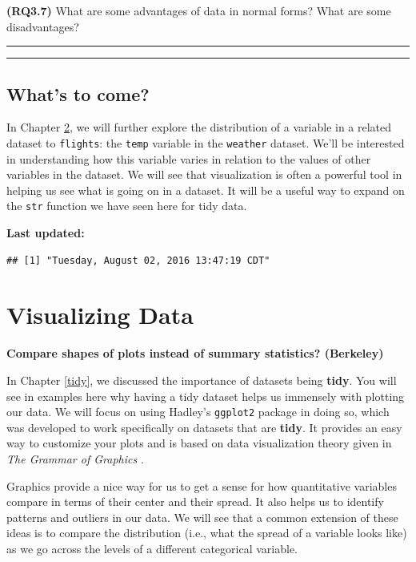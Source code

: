 \documentclass[]{tufte-book}
\begin{document}
\textbf{(RQ3.7)} What are some advantages of data in normal forms? What
are some disadvantages?

\begin{center}\rule{0.5\linewidth}{\linethickness}\end{center}

\begin{center}\rule{0.5\linewidth}{\linethickness}\end{center}

\section{What's to come?}\label{whats-to-come}

In Chapter \ref{viz}, we will further explore the distribution of a
variable in a related dataset to \texttt{flights}: the \texttt{temp}
variable in the \texttt{weather} dataset. We'll be interested in
understanding how this variable varies in relation to the values of
other variables in the dataset. We will see that visualization is often
a powerful tool in helping us see what is going on in a dataset. It will
be a useful way to expand on the \texttt{str} function we have seen here
for tidy data.

\textbf{Last updated:}

\begin{verbatim}
## [1] "Tuesday, August 02, 2016 13:47:19 CDT"
\end{verbatim}

\chapter{Visualizing Data}\label{viz}

\textbf{Compare shapes of plots instead of summary statistics?
(Berkeley)}

In Chapter \ref{tidy}, we discussed the importance of datasets being
\textbf{tidy}. You will see in examples here why having a tidy dataset
helps us immensely with plotting our data. We will focus on using
Hadley's \texttt{ggplot2} package in doing so, which was developed to
work specifically on datasets that are \textbf{tidy}. It provides an
easy way to customize your plots and is based on data visualization
theory given in \emph{The Grammar of Graphics} \citep{wilkinson2005}.

Graphics provide a nice way for us to get a sense for how quantitative
variables compare in terms of their center and their spread. It also
helps us to identify patterns and outliers in our data. We will see that
a common extension of these ideas is to compare the distribution (i.e.,
what the spread of a variable looks like) as we go across the levels of
a different categorical variable.
\end{document}
